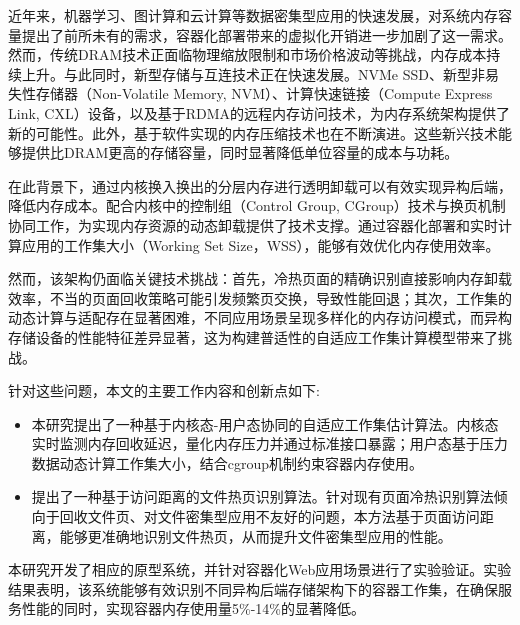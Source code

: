 	
\begin{chineseabstract}

近年来，机器学习、图计算和云计算等数据密集型应用的快速发展，对系统内存容量提出了前所未有的需求，容器化部署带来的虚拟化开销进一步加剧了这一需求。然而，传统DRAM技术正面临物理缩放限制和市场价格波动等挑战，内存成本持续上升。与此同时，新型存储与互连技术正在快速发展。NVMe SSD、新型非易失性存储器（Non-Volatile Memory, NVM）、计算快速链接（Compute Express Link, CXL）设备，以及基于RDMA的远程内存访问技术，为内存系统架构提供了新的可能性。此外，基于软件实现的内存压缩技术也在不断演进。这些新兴技术能够提供比DRAM更高的存储容量，同时显著降低单位容量的成本与功耗。

在此背景下，通过内核换入换出的分层内存进行透明卸载可以有效实现异构后端，降低内存成本。配合内核中的控制组（Control Group, CGroup）技术与换页机制协同工作，为实现内存资源的动态卸载提供了技术支撑。通过容器化部署和实时计算应用的工作集大小（Working Set Size，WSS），能够有效优化内存使用效率。

然而，该架构仍面临关键技术挑战：首先，冷热页面的精确识别直接影响内存卸载效率，不当的页面回收策略可能引发频繁页交换，导致性能回退；其次，工作集的动态计算与适配存在显著困难，不同应用场景呈现多样化的内存访问模式，而异构存储设备的性能特征差异显著，这为构建普适性的自适应工作集计算模型带来了挑战。

针对这些问题，本文的主要工作内容和创新点如下:
\begin{itemize}
    \item 本研究提出了一种基于内核态-用户态协同的自适应工作集估计算法。内核态实时监测内存回收延迟，量化内存压力并通过标准接口暴露；用户态基于压力数据动态计算工作集大小，结合cgroup机制约束容器内存使用。
    \item 提出了一种基于访问距离的文件热页识别算法。针对现有页面冷热识别算法倾向于回收文件页、对文件密集型应用不友好的问题，本方法基于页面访问距离，能够更准确地识别文件热页，从而提升文件密集型应用的性能。
\end{itemize}

本研究开发了相应的原型系统，并针对容器化Web应用场景进行了实验验证。实验结果表明，该系统能够有效识别不同异构后端存储架构下的容器工作集，在确保服务性能的同时，实现容器内存使用量5\%-14\%的显著降低。

\end{chineseabstract}